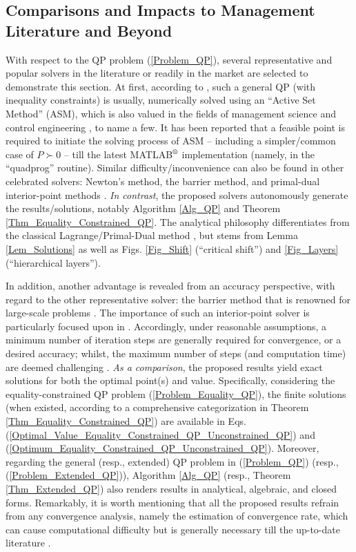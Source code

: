 \documentclass{imaman}
\numberwithin{equation}{section}
\begin{document}
\subsection{Comparisons and Impacts to Management Literature and Beyond}
\label{Subsec_Literature_Comparison}
With respect to the QP problem (\ref{Problem_QP}), several representative and popular solvers in the literature or readily in the market \citep{NoWr:06} are selected to demonstrate this section. At first, according to \cite{Lu(Ye):03(16)}, such a general QP (with inequality constraints) is usually, numerically solved using an ``Active Set Method'' (ASM), which is also valued in the fields of management science \citep{Hey:acc,KoYa:91} and control engineering \citep{JoFo:13}, to name a few. It has been reported that a feasible point is required to initiate the solving process of ASM -- including a simpler/common case of $P\succ 0$ \citep{Lu(Ye):03(16)} -- till the latest MATLAB$\textsuperscript{\textregistered}$ implementation (namely, in the ``quadprog'' routine). Similar difficulty/inconvenience can also be found in other celebrated solvers: Newton's method, the barrier method, and primal-dual interior-point methods \citep{BoVa:04,Hey:acc,JoFo:13}. \textit{In contrast}, the proposed solvers autonomously generate the results/solutions, notably Algorithm \ref{Alg_QP} and Theorem \ref{Thm_Equality_Constrained_QP}. The analytical philosophy differentiates from the classical Lagrange/Primal-Dual method \citep{BoVa:04,Lu(Ye):03(16),NoWr:06}, but stems from Lemma \ref{Lem_Solutions} as well as Figs. \ref{Fig_Shift} (``critical shift'') and \ref{Fig_Layers} (``hierarchical layers'').

In addition, another advantage is revealed from an accuracy perspective, with regard to the other representative solver: the barrier method that is renowned for large-scale problems \citep{JoFo:13}. The importance of such an interior-point solver is particularly focused upon in \cite[Chapter 11]{BoVa:04}. Accordingly, under reasonable assumptions, a minimum number of iteration steps are generally required for convergence, or a desired accuracy; whilst, the maximum number of steps (and computation time) are deemed challenging \citep{JoFo:13}. \textit{As a comparison}, the proposed results yield exact solutions for both the optimal point(s) and value. Specifically, considering the equality-constrained QP problem (\ref{Problem_Equality_QP}), the finite solutions (when existed, according to a comprehensive categorization in Theorem \ref{Thm_Equality_Constrained_QP}) are available in Eqs. (\ref{Optimal_Value_Equality_Constrained_QP_Unconstrained_QP}) and (\ref{Optimum_Equality_Constrained_QP_Unconstrained_QP}). Moreover, regarding the general (resp., extended) QP problem in (\ref{Problem_QP}) (resp., (\ref{Problem_Extended_QP})), Algorithm \ref{Alg_QP} (resp., Theorem \ref{Thm_Extended_QP}) also renders results in analytical, algebraic, and closed forms. Remarkably, it is worth mentioning that all the proposed results refrain from any convergence analysis, namely the estimation of convergence rate, which can cause computational difficulty \citep{DuJoWaWi:15} but is generally necessary till the up-to-date literature \citep{LiTsWo:20,MATLAB}.
\end{document}
